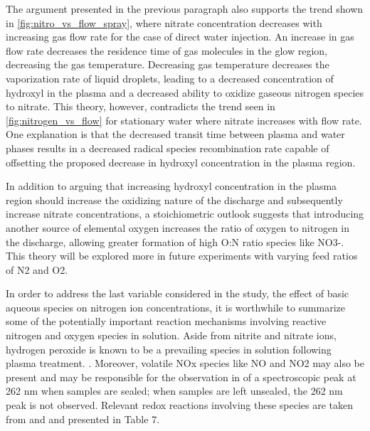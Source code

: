 The argument presented in the previous paragraph also supports the trend shown in \cref{fig:nitro_vs_flow_spray}, where nitrate concentration decreases with increasing gas flow rate for the case of direct water injection.  An increase in gas flow rate decreases the residence time of gas molecules in the glow region, decreasing the gas temperature.  Decreasing gas temperature decreases the vaporization rate of liquid droplets, leading to a decreased concentration of hydroxyl in the plasma and a decreased ability to oxidize gaseous nitrogen species to nitrate.  This theory, however, contradicts the trend seen in \cref{fig:nitrogen_vs_flow} for stationary water where nitrate increases with flow rate.  One explanation is that the decreased transit time between plasma and water phases results in a decreased radical species recombination rate capable of offsetting the proposed decrease in hydroxyl concentration in the plasma region.

In addition to arguing that increasing hydroxyl concentration in the plasma region should increase the oxidizing nature of the discharge and subsequently increase nitrate concentrations, a stoichiometric outlook suggests that introducing another source of elemental oxygen increases the ratio of oxygen to nitrogen in the discharge, allowing greater formation of high O:N ratio species like NO3-.  This theory will be explored more in future experiments with varying feed ratios of N2 and O2.

In order to address the last variable considered in the study, the effect of basic aqueous species on nitrogen ion concentrations, it is worthwhile to summarize some of the potentially important reaction mechanisms involving reactive nitrogen and oxygen species in solution.   Aside from nitrite and nitrate ions, hydrogen peroxide is known to be a prevailing species in solution following plasma treatment. \cite{traylor2011long}.  Moreover, volatile NOx species like NO and NO2 may also be present and may be responsible for the observation in \cite{traylor2011long} of a spectroscopic peak at 262 nm when samples are sealed; when samples are left unsealed, the 262 nm peak is not observed.  Relevant redox reactions involving these species are taken from \cite{brisset2012peroxynitrite}  and \cite{greenwood1984chemistry} and presented in Table 7.

